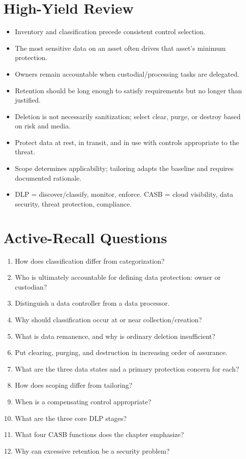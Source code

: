 \documentclass[10pt,letterpaper]{article}
\begin{document}
\section{High-Yield Review}
\begin{itemize}
\item Inventory and classification precede consistent control selection.
\item The most sensitive data on an asset often drives that asset's minimum protection.
\item Owners remain accountable when custodial/processing tasks are delegated.
\item Retention should be long enough to satisfy requirements but no longer than justified.
\item Deletion is not necessarily sanitization; select clear, purge, or destroy based on risk and media.
\item Protect data at rest, in transit, and in use with controls appropriate to the threat.
\item Scope determines applicability; tailoring adapts the baseline and requires documented rationale.
\item DLP = discover/classify, monitor, enforce. CASB = cloud visibility, data security, threat protection, compliance.
\end{itemize}

\section{Active-Recall Questions}
\begin{enumerate}
\item How does classification differ from categorization?
\item Who is ultimately accountable for defining data protection: owner or custodian?
\item Distinguish a data controller from a data processor.
\item Why should classification occur at or near collection/creation?
\item What is data remanence, and why is ordinary deletion insufficient?
\item Put clearing, purging, and destruction in increasing order of assurance.
\item What are the three data states and a primary protection concern for each?
\item How does scoping differ from tailoring?
\item When is a compensating control appropriate?
\item What are the three core DLP stages?
\item What four CASB functions does the chapter emphasize?
\item Why can excessive retention be a security problem?
\end{enumerate}
\end{document}
